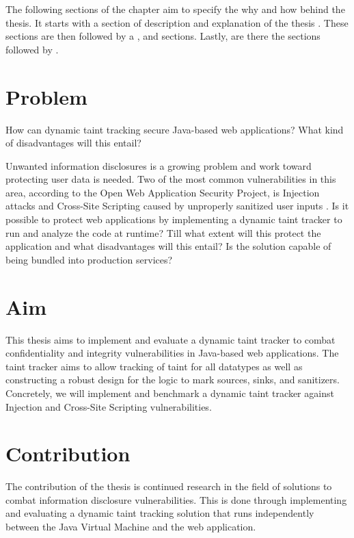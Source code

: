 The following sections of the chapter aim to specify the why and how behind the thesis. It starts with a section of \textit{} description and explanation of the thesis \textit{}. These sections are then followed by a \textit{}, \textit{} and \textit{} sections. Lastly, are there the sections \textit{} followed by \textit{}.



\section{Problem}
\label{Problem}
\begin{chapquote}{}
    How can dynamic taint tracking secure Java-based web applications? What kind of disadvantages will this entail?
\end{chapquote}

\noindent
Unwanted information disclosures is a growing problem and work toward protecting user data is needed. Two of the most common vulnerabilities in this area, according to the Open Web Application Security Project, is Injection attacks and Cross-Site Scripting caused by unproperly sanitized user inputs \parencite{OWASP2017}. Is it possible to protect web applications by implementing a dynamic taint tracker to run and analyze the code at runtime? Till what extent will this protect the application and what disadvantages will this entail? Is the solution capable of being bundled into production services?



\section{Aim}
\label{Aim}
This thesis aims to implement and evaluate a dynamic taint tracker to combat confidentiality and integrity vulnerabilities in Java-based web applications. The taint tracker aims to allow tracking of taint for all datatypes as well as constructing a robust design for the logic to mark sources, sinks, and sanitizers. Concretely, we will implement and benchmark a dynamic taint tracker against Injection and Cross-Site Scripting vulnerabilities. 



\section{Contribution}
\label{Contribution}
The contribution of the thesis is continued research in the field of solutions to combat information disclosure vulnerabilities. This is done through implementing and evaluating a dynamic taint tracking solution that runs independently between the Java Virtual Machine and the web application. 



